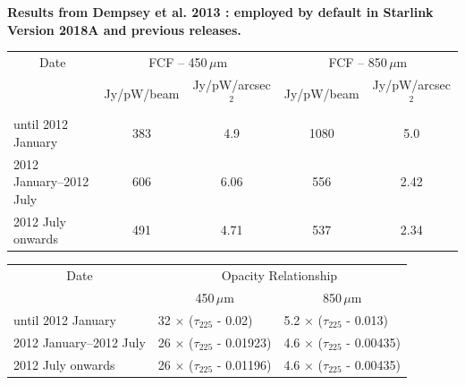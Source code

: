 \textbf{Results from Dempsey et al. 2013 \cite{dempsey12}: employed by
default in Starlink Version 2018A and previous releases.}\\
\begin{table}[h!]
\begin{center}
\begin{tabular}{|l|c|c|c|c|}
 \hline
 \multicolumn{1}{|c|}{Date} &
 \multicolumn{2}{c|}{FCF -- 450\,$\mu$m} &
 \multicolumn{2}{c|}{FCF -- 850\,$\mu$m} \\
\cline{2-5}
& Jy/pW/beam &Jy/pW/arcsec$^2$ & Jy/pW/beam &Jy/pW/arcsec$^2$ \\
 \hline
until 2012 January       & 383 & 4.9\hphantom{0} & 1080            & 5.0\hphantom{0} \\
2012 January--2012 July  & 606 & 6.06            & \hphantom{1}556 & 2.42 \\
2012 July onwards        & 491 & 4.71            & \hphantom{1}537 & 2.34 \\
\hline
\end{tabular}
\end{center}
\end{table}
\vspace{-2mm}
\begin{table}[h!]
\begin{center}
\begin{tabular}{|l|l|l|}
 \hline
 \multicolumn{1}{|c}{Date} & \multicolumn{2}{|c|}{Opacity Relationship}  \\ \cline{2-3}
                           & \multicolumn{1}{|c|}{450\,$\mu$m}    & \multicolumn{1}{|c|}{850\,$\mu$m} \\ \hline
until 2012 January         & 32 $\times$ ($\tau_{225}$ - 0.02)    & 5.2 $\times$ ($\tau_{225}$ - 0.013)  \\
2012 January--2012 July    & 26 $\times$ ($\tau_{225}$ - 0.01923) & 4.6 $\times$ ($\tau_{225}$ - 0.00435) \\
2012 July onwards          & 26 $\times$ ($\tau_{225}$ - 0.01196) & 4.6 $\times$ ($\tau_{225}$ - 0.00435) \\
\hline
\end{tabular}
\end{center}
\end{table}
